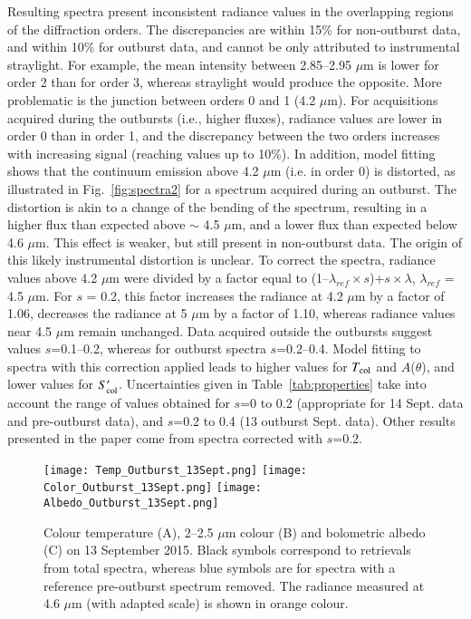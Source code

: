 \documentclass[a4paper,fleqn,usenatbib]{mnras}
\begin{document}
Resulting spectra present inconsistent radiance values in the
overlapping regions of the diffraction orders. The discrepancies
are within 15\% for non-outburst data, and within 10\% for
outburst data, and cannot be only attributed to instrumental
straylight. For example, the mean intensity between 2.85--2.95
$\mu$m is lower for order 2 than for order 3,  whereas straylight
would produce the opposite. More problematic is the junction
between orders 0 and 1 (4.2 $\mu$m). For acquisitions acquired
during the outbursts (i.e., higher fluxes), radiance values are
lower in order 0 than in order 1, and the discrepancy between the
two orders increases with increasing signal (reaching values up to
10\%). In addition, model fitting shows that the continuum
emission above 4.2 $\mu$m (i.e. in order 0) is distorted, as
illustrated in Fig.~\ref{fig:spectra2} for a spectrum acquired
during an outburst. The distortion is akin to a change of the
bending of the spectrum, resulting in a higher flux than expected
above $\sim$ 4.5 $\mu$m, and a lower flux than expected below 4.6
$\mu$m. This effect is weaker, but still present in non-outburst
data. The origin of this likely instrumental distortion is
unclear. To correct the spectra, radiance values above 4.2 $\mu$m
were divided by a factor equal to (1--$\lambda_{ref}\times s$)+$s
\times \lambda$, $\lambda_{ref}$ = 4.5 $\mu$m. For $s$ = 0.2, this
factor increases the radiance at 4.2 $\mu$m by a factor of 1.06,
decreases the radiance at 5 $\mu$m by a factor of 1.10, whereas
radiance values near 4.5 $\mu$m remain unchanged. Data acquired
outside the outbursts suggest values $s$=0.1--0.2, whereas for
outburst spectra $s$=0.2--0.4. Model fitting to spectra with this
correction applied leads to higher values for $T_{\rm col}$ and
$A$($\theta$), and lower values for $S'_{\rm col}$.
Uncertainties given in Table~\ref{tab:properties} take into
account the range of values obtained for $s$=0 to 0.2 (appropriate
for 14 Sept. data and pre-outburst data), and $s$=0.2 to 0.4 (13
outburst Sept. data). Other results presented in the paper come
from spectra corrected with $s$=0.2.


\begin{figure}
   \centering
    \texttt{[image: Temp\_Outburst\_13Sept.png]}
    \texttt{[image: Color\_Outburst\_13Sept.png]}
    \texttt{[image: Albedo\_Outburst\_13Sept.png]}
\caption{Colour temperature (A), 2--2.5 $\mu$m colour (B) and bolometric albedo (C) on 13 September 2015. Black symbols correspond to retrievals from total spectra, whereas blue symbols are for spectra with a reference pre-outburst spectrum removed. The radiance measured at 4.6 $\mu$m (with adapted scale) is shown in orange colour.    }
    \label{fig:properties-13SEPT}
\end{figure}
\end{document}
